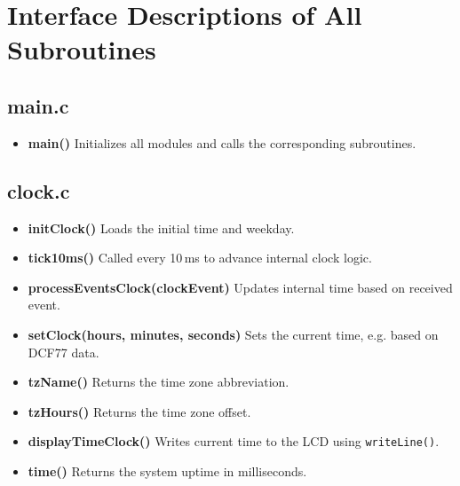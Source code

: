 \documentclass[a4paper,12pt]{article}
\begin{document}
\newpage


\section{Interface Descriptions of All Subroutines}


\subsection{main.c}
\begin{itemize}
    \item \textbf{main()}  
    Initializes all modules and calls the corresponding subroutines.
\end{itemize}


\subsection{clock.c}
\begin{itemize}
    \item \textbf{initClock()}  
    Loads the initial time and weekday.

    \item \textbf{tick10ms()}  
    Called every 10\,ms to advance internal clock logic.

    \item \textbf{processEventsClock(clockEvent)}  
    Updates internal time based on received event.

    \item \textbf{setClock(hours, minutes, seconds)}  
    Sets the current time, e.g. based on DCF77 data.

    \item \textbf{tzName()}  
    Returns the time zone abbreviation.

    \item \textbf{tzHours()}  
    Returns the time zone offset.

    \item \textbf{displayTimeClock()}  
    Writes current time to the LCD using \texttt{writeLine()}.

    \item \textbf{time()}  
    Returns the system uptime in milliseconds.
\end{itemize}
\end{document}
